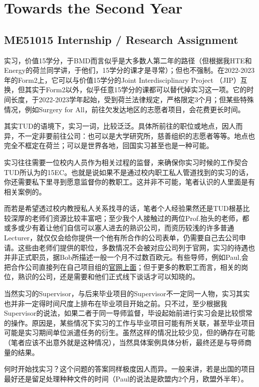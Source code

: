 \vspace{\betsubsec} %
\section{Towards the Second Year}
\subsection{ME51015 Internship / Research Assignment}
实习，价值15学分，于BMD而言似乎是大多数人第二年的路径（但根据我HTE和Energy的荷兰同学讲，于他们，15学分的课才是寻常）；但也不强制。在2022-2023年的Form2上，它可以与价值15学分的Joint Interdisciplinary Project （JIP）互换，但其实于Form2以外，似乎任意15学分的课都可以替代掉实习这一项。它的时间长度，于2022-2023学年起始，受到荷兰法律规定，严格限定3个月；但某些特殊情况，例如Surgery for All，前往欠发达地区的志愿者项目，会花费更长时间。

其实TUD的语境下，实习一词，比较泛泛。具体所前往的职位或地点，因人而异，不一定非要前往公司：也可以是大学研究所，慈善组织的志愿者等等。地点也完全不框定在荷兰；可以是世界各地，回国实习甚至也是一种可能。

实习往往需要一位校内人员作为相关过程的监督，来确保你实习时候的工作契合TUD所认为的15EC。也就是说如果不是通过校内职工私人管道找到的实习的话，你还需要私下里寻到愿意监督你的教职工。这并非不可能，笔者认识的人里面是有相关案例的。

而若是希望透过校内教授私人关系找寻的话，笔者个人经验果然还是TUD根基比较深厚的老师们资源比较丰富吧；至少我个人接触过的两位Prof.抬头的老师，都或多或少有着让他们自信可以塞人进去的熟识公司，而资历较浅的许多普通Lecturer，就仅仅会给你提供一个他有所合作的公司表单，仍需要自己去公司申请。这些由老师们提供的职位，多数情况不会被对应公司列于官网，实习的待遇也并非正式职员，据Bob所描述一般一个月不过数百欧元。有些导师，例如Paul,会把合作公司直接列在自己项目组的\href{https://www.bitegroup.nl/internships/}{\uline{官网上面}}；但于更多的教职工而言，相关的岗位，熟识的公司，还是需要和他们正式线下谈话才可以知晓的。

当然实习的Supervisor，与后来毕业项目的Supervisor不一定同一人物，实习其实也并非一定得时间尺度上排布在毕业项目开始之前。只不过，至少根据我Supervisor的说法，如果二者于同一导师监督，毕设起始前进行实习会是比较惯常的操作。原因是，某些情况下实习的工作与毕业项目可能有所关联，甚至毕业项目可能是实习期间单位派遣任务的衍生。虽然这样的情况比较少见，但的确存在可能（笔者应该不出意外就是这种情况），当然具体案例具体分析，最终还是与导师商量的结果。

何时开始找实习？这个问题的答案同样极度因人而异。一般来讲，若是出国的项目最好还是留足处理种种文件的时间（Paul的说法是欧盟内2个月，欧盟外半年）。

